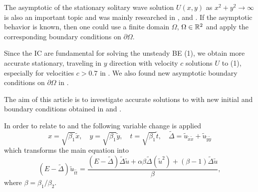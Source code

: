 \documentclass[11pt,a4paper,twoside]{article}
\begin{document}
The asymptotic of the stationary solitary wave solution $U(x,y)$ as $x^2+y^2 \rightarrow \infty$ is also an important topic and was mainly researched in \cite{chr-chr-07}, \cite{Ch2012} and \cite{BoundaryProblem}. If the asymptotic behavior is known, then one could use a finite domain $\Omega$,  $\Omega \in \mathbb{R}^2$ and apply the corresponding boundary conditions on $\partial \Omega$. 

Since the IC are  fundamental for solving the unsteady BE (1), we obtain more accurate stationary, traveling in $y$  direction with velocity $c$ solutions $U$ to (1), especially for velocities $c > 0.7$ in \cite{EllipticProblem}. We also found new asymptotic boundary conditions on $\partial \Omega$ in \cite{BoundaryProblem}.

The aim of this article is to investigate accurate solutions to  with new initial and boundary conditions obtained in \cite{EllipticProblem} and \cite{BoundaryProblem}. 

In order to relate to \cite{EllipticProblem} and \cite{BoundaryProblem}
the following variable change is applied
\begin{equation}\label{vc}
x = \sqrt{\beta_1} \tilde x, \quad y = \sqrt{\beta_1} \tilde y, \quad t = \sqrt{\beta_1} \tilde t, \quad \tilde \Delta = \tilde u_{\tilde x \tilde x} + \tilde u_{\tilde y \tilde y}
\end{equation}
which transforms the main equation   into 
\begin{equation}\label{eqVC}
(E-\tilde \Delta)  \tilde u_{\tilde t \tilde t} = \frac{(E-\tilde\Delta)\tilde\Delta \tilde u + \alpha \beta \tilde\Delta(\tilde u^2) + (\beta -1)\tilde\Delta \tilde u}{\beta},
\end{equation}
where $\beta = \beta_1 / \beta_2$. 
%
%
%
\end{document}

